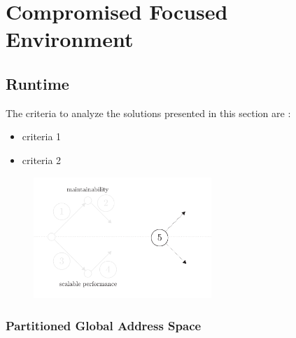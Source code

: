 \section{Compromised Focused Environment} \label{chapter3:software-abstraction}





\subsection{Runtime}

The criteria to analyze the solutions presented in this section are :
\begin{itemize}
\item criteria 1
\item criteria 2
\end{itemize}


\begin{figure}[h!]
\begin{center}
\includegraphics[width=0.6\textwidth]{../ressources/state-of-the-art-5.pdf}
\end{center}
\end{figure}





\subsubsection{Partitioned Global Address Space}

